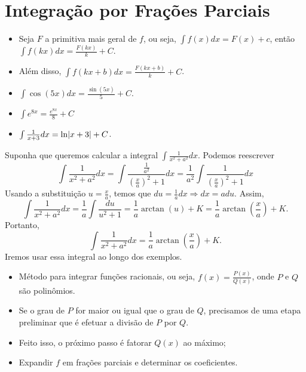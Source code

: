 \section{Integração por Frações Parciais}
\label{sec:INtegracao_Fracoes_Parciais}

\begin{itemize}
  \item Seja $F$ a primitiva mais geral de $f$, ou seja,
        \(\int f(x)dx= F(x)+c\), então
        \(\int f(kx) dx= \frac{F(kx)}{k}+C\).
  \item Além disso, \(\int f(kx+b)dx= \frac{F(kx+b)}{k}+C\).
  \item \(\int \cos(5x) dx= \frac{\sin(5x)}{5}+C\).
  \item \(\int e^{8x}= \frac{e^{8x}}{8}+C\)
  \item \(\int \frac{1}{x+3}dx= \ln\abs{x+3}+C\).
\end{itemize}

Suponha que queremos calcular a integral $\int \frac{1}{x^2+a^2}dx$.
Podemos reescrever
\[
  \int \frac{1}{x^2+a^2}dx
  = \int \frac{\frac{1}{a^2}}{\left( \frac{x}{a}\right)^2+1 }dx
  = \frac{1}{a^2} \int \frac{1}{\left( \frac{x}{a}\right)^2+1} dx
\]
Usando a substituição $u= \frac{x}{a}$, temos que
$du=\frac{1}{a}dx \Longrightarrow dx=adu$.
Assim,
\[
  \int \frac{1}{x^2+a^2}dx
  = \frac{1}{a} \int \frac{du}{u^2+1}
  = \frac{1}{a} \arctan(u)+K
  =\frac{1}{a} \arctan\left(\frac{x}{a}\right)+K.
\]
Portanto,
\[
  \int \frac{1}{x^2+a^2}dx=\frac{1}{a} \arctan\left(\frac{x}{a}\right)+K.
\]
Iremos usar essa integral ao longo dos exemplos.

\begin{theory}
\begin{itemize}
  \item Método para integrar funções racionais, ou seja,
        $f(x)=\frac{P(x)}{Q(x)}$, onde $P$ e $Q$ são polinômios.

  \item Se o grau de $P$ for maior ou igual que o grau de $Q$,
        precisamos de uma etapa preliminar que é efetuar a divisão
        de $P$ por $Q$.

  \item Feito isso, o próximo passo é fatorar $Q(x)$ ao máximo;

  \item Expandir $f$ em frações parciais e determinar os coeficientes.
\end{itemize}
\end{theory}

